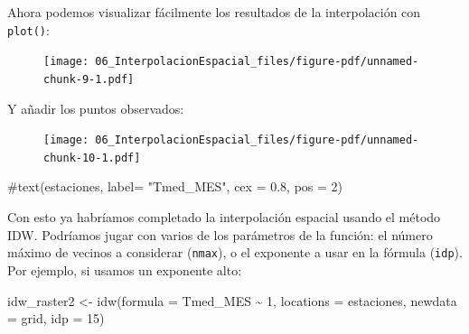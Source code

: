 \documentclass[
  letterpaper,
  DIV=11,
  numbers=noendperiod]{scrreprt}
\newenvironment{Shaded}{\begin{snugshade}}{\end{snugshade}}
\newcommand{\AttributeTok}[1]{\textcolor[rgb]{0.40,0.45,0.13}{#1}}
\newcommand{\CommentTok}[1]{\textcolor[rgb]{0.37,0.37,0.37}{#1}}
\newcommand{\DecValTok}[1]{\textcolor[rgb]{0.68,0.00,0.00}{#1}}
\newcommand{\FloatTok}[1]{\textcolor[rgb]{0.68,0.00,0.00}{#1}}
\newcommand{\FunctionTok}[1]{\textcolor[rgb]{0.28,0.35,0.67}{#1}}
\newcommand{\NormalTok}[1]{\textcolor[rgb]{0.00,0.23,0.31}{#1}}
\newcommand{\OtherTok}[1]{\textcolor[rgb]{0.00,0.23,0.31}{#1}}
\newcommand{\SpecialCharTok}[1]{\textcolor[rgb]{0.37,0.37,0.37}{#1}}
\begin{document}
Ahora podemos visualizar fácilmente los resultados de la interpolación
con \texttt{plot()}:

\begin{Shaded}
\end{Shaded}

\begin{figure}[H]

{\centering \texttt{[image: 06\_InterpolacionEspacial\_files/figure-pdf/unnamed-chunk-9-1.pdf]}

}

\end{figure}

Y añadir los puntos observados:

\begin{Shaded}
\end{Shaded}

\begin{figure}[H]

{\centering \texttt{[image: 06\_InterpolacionEspacial\_files/figure-pdf/unnamed-chunk-10-1.pdf]}

}

\end{figure}

\begin{Shaded}
\begin{Highlighting}[]
\CommentTok{\#text(estaciones, label= "Tmed\_MES", cex = 0.8, pos = 2)}
\end{Highlighting}
\end{Shaded}

Con esto ya habríamos completado la interpolación espacial usando el
método IDW. Podríamos jugar con varios de los parámetros de la función:
el número máximo de vecinos a considerar (\texttt{nmax}), o el exponente
a usar en la fórmula (\texttt{idp}). Por ejemplo, si usamos un exponente
alto:

\begin{Shaded}
\begin{Highlighting}[]
\NormalTok{idw\_raster2 }\OtherTok{\textless{}{-}} \FunctionTok{idw}\NormalTok{(}\AttributeTok{formula =}\NormalTok{ Tmed\_MES }\SpecialCharTok{\textasciitilde{}} \DecValTok{1}\NormalTok{, }\AttributeTok{locations =}\NormalTok{ estaciones, }\AttributeTok{newdata =}\NormalTok{ grid, }\AttributeTok{idp =} \DecValTok{15}\NormalTok{)}
\end{Highlighting}
\end{Shaded}
\end{document}
